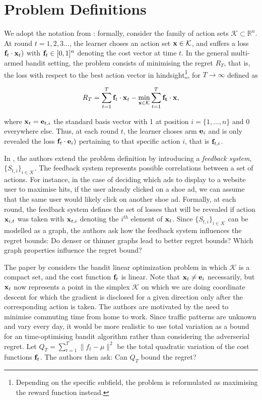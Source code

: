 \section{Problem Definitions}
We adopt the notation from \citep{alon, hazan}: formally, consider the family of action sets $\mathcal{K}\subset \mathbb{R}^n$. At round $t=1,2,3...$, the learner choses an action set ${\bf x}\in \mathcal{K}$, and suffers a loss ${\bf f}_t\cdot{\bf x}_t)$ with ${\bf f}_t\in [0,1]^n$ denoting the cost vector at time $t$. In the general multi-armed bandit setting, the problem consists of minimising the regret $R_T$, that is, the loss with respect to the best action vector in hindsight\footnote{Depending on the specific subfield, the problem is reformulated as maximising the reward function instead.}, for $T\to\infty$ defined as

\begin{align}
	R_T=\sum_{t=1}^T{\bf f}_t\cdot{\bf x}_t-\min_{{\bf x}\in \mathcal{K}}\sum_{t=1}^T {\bf f_t}\cdot{\bf x},
\end{align}

where ${\bf x}_t={\bf e}_{t,i}$ the standard basis vector with 1 at position $i=\{1,...,n\}$ and $0$ everywhere else. Thus, at each round $t$, the learner choses arm ${\bf e}_i$ and is only revealed the loss ${\bf f}_t\cdot{\bf e}_i)$ pertaining to that specific action $i$, that is ${\bf f}_{t,i}$.  

In \citep{alon}, the authors extend the problem definition by introducing a \textit{feedback system}, $\{S_{t,i}\}_{i\in \mathcal{K}}$. The feedback system represents possible correlations between a set of actions. For instance, in the case of deciding which ads to display to a website user to maximise hits, if the user already clicked on a shoe ad, we can assume that the same user would likely click on another shoe ad. Formally, at each round, the feedback system defines the set of losses that will be revealed if action ${\bf x}_{i,t}$ was taken with ${\bf x}_{t,i}$ denoting the $i^{th}$ element of ${\bf x}_t$. Since $\{S_{t,i}\}_{i\in \mathcal{K}}$ can be modelled as a graph, the authors ask how the feedback system influences the regret bounds: Do denser or thinner graphs lead to better regret bounds? Which graph properties influence the regret bound? 

The paper by \citep{hazan} considers the bandit linear optimization problem in which $\mathcal{K}$ is a compact set, and the cost function ${\bf f}_t$ is linear. Note that ${\bf x}_t\not={\bf e}_i$ necessarily, but ${\bf x}_t$ now represents a point in the simplex $\mathcal{K}$ on which we are doing coordinate descent for which the gradient is disclosed for a given direction only after the corresponding action is taken. The authors are motivated by the need to minimise commuting time from home to work. Since traffic patterns are unknown and vary every day, it would be more realistic to use total variation as a bound for an time-optimising bandit algorithm rather than considering the adverserial regret. Let $Q_T=\sum_{t=1}^T \| f_t - \mu \|^2$ be the total quadratic variation of the cost functions ${\bf f}_t$. The authors then ask: Can $Q_T$ bound the regret?

